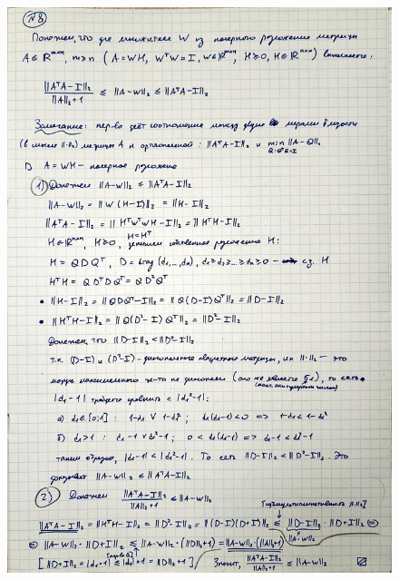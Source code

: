 \documentclass{article}
\begin{document}
		\begin{figure}[h!]
			\includegraphics[width=0.95\linewidth]{handwritten/matcomp_hw1_8}
		\end{figure}
\end{document}

